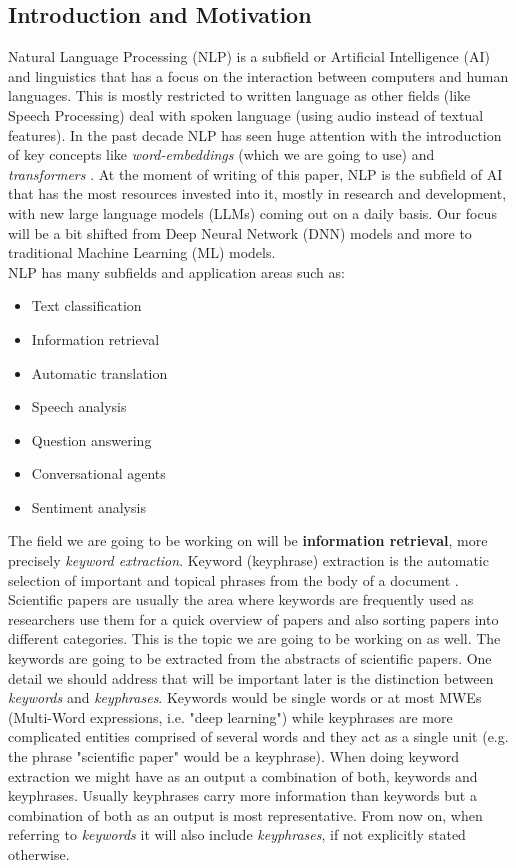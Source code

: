 \documentclass[12pt]{article}
\numberwithin{equation}{section}
\begin{document}
\begin{spacing}{1.5}
	\section{Introduction and Motivation}
	Natural Language Processing (NLP) is a subfield or Artificial Intelligence (AI) and linguistics that has a focus on the interaction between computers and human languages. This is mostly restricted to written language as other fields (like Speech Processing) deal with spoken language (using audio instead of textual features). In the past decade NLP has seen huge attention with the introduction of key concepts like \textit{word-embeddings} \cite{word-embedding-survey} (which we are going to use) and \textit{transformers} \cite{transformers-survey}. At the moment of writing of this paper, NLP is the subfield of AI that has the most resources invested into it, mostly in research and development, with new large language models (LLMs) coming out on a daily basis. Our focus will be a bit shifted from Deep Neural Network (DNN) models and more to traditional Machine Learning (ML) models. \\
	NLP has many subfields and application areas such as:
	\begin{itemize}
		\item Text classification
		\item Information retrieval
		\item Automatic translation
		\item Speech analysis 
		\item Question answering
		\item Conversational agents
		\item Sentiment analysis
	\end{itemize} 
	The field we are going to be working on will be \textbf{information retrieval}, more precisely \textit{keyword extraction}. Keyword (keyphrase) extraction is the automatic selection of important and topical phrases from the body of a document \cite{keyword-extraction-0}. Scientific papers are usually the area where keywords are frequently used as researchers use them for a quick overview of papers and also sorting papers into different categories. This is the topic we are going to be working on as well. The keywords are going to be extracted from the abstracts of scientific papers. One detail we should address that will be important later is the distinction between \textit{keywords} and \textit{keyphrases}. Keywords would be single words or at most MWEs (Multi-Word expressions, i.e. "deep learning") while keyphrases are more complicated entities comprised of several words and they act as a single unit (e.g. the phrase "scientific paper" would be a keyphrase). When doing keyword extraction we might have as an output a combination of both, keywords and keyphrases. Usually keyphrases carry more information than keywords but a combination of both as an output is most representative. From now on, when referring to \textit{keywords} it will also include \textit{keyphrases}, if not explicitly stated otherwise.
	

\end{spacing}
\end{document}

